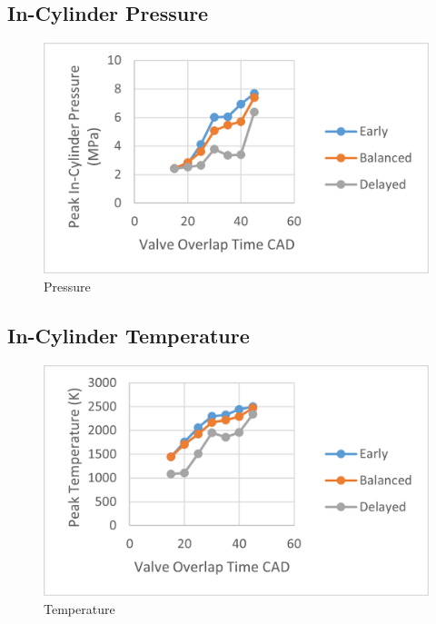 \documentclass[conference]{IEEEtran}
\begin{document}
\subsection{In-Cylinder Pressure}
\begin{figure}[htbp]
    \centerline{\includegraphics{Plots/pressure.png}}
    \caption{Pressure}
    \label{plt_2}
    \end{figure}

\subsection{In-Cylinder Temperature}
\begin{figure}[htbp]
    \centerline{\includegraphics{Plots/temperature.png}}
    \caption{Temperature}
    \label{plt_3}
    \end{figure}
\end{document}
